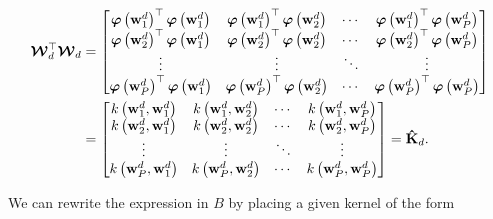 \documentclass[]{article}
\newcommand{\kernelww}[2]{k\left(\mathbf{w}_{#1}^d,\mathbf{w}_{#2}^d\right)}
\newcommand{\projMat}{\boldsymbol{\mathcal{W}}_d}
\newcommand{\phiwld}[1]{\boldsymbol{\varphi}\left(\mathbf{w}_{#1}^d\right)}
\newcommand{\phiwldI}[2]{\varphi_{#2}\left(\mathbf{w}_{#1}^d\right)}
\begin{document}
\begin{align}
 \projMat^\top \projMat 
  &=\left[
  \begin{matrix}
  \phiwld{1}^\top\phiwld{1}& \phiwld{1}^\top\phiwld{2} & \cdots & \phiwld{1}^\top\phiwld{P} \\
  \phiwld{2}^\top\phiwld{1}& \phiwld{2}^\top\phiwld{2} & \cdots & \phiwld{2}^\top\phiwld{P} \\
  \vdots  & \vdots  & \ddots & \vdots  \\
  \phiwld{P}^\top\phiwld{1}& \phiwld{P}^\top\phiwld{2} & \cdots & \phiwld{P}^\top\phiwld{P}
  \end{matrix}\right] \notag\\
  &=
  \left[ \begin{matrix}
   \kernelww{1}{1} & \kernelww{1}{2} & \cdots & \kernelww{1}{P}\\
   \kernelww{2}{1} & \kernelww{2}{2} & \cdots & \kernelww{2}{P}\\
   \vdots  & \vdots  & \ddots & \vdots  \\
   \kernelww{P}{1} & \kernelww{P}{2} & \cdots & \kernelww{P}{P}\\
   \end{matrix}\right] = \mathbf{\hat{K}}_{d}. \label{eq:Kp}
\end{align}


We can rewrite the expression in $B$ by placing a given kernel of the form
\end{document}
